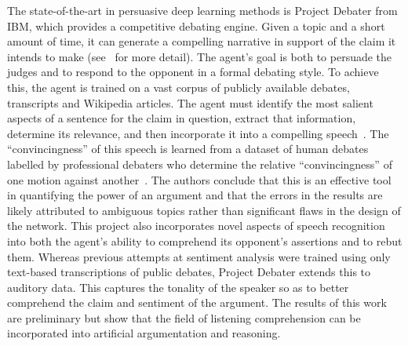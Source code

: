 The state-of-the-art in persuasive deep learning methods is Project Debater from IBM, which provides a competitive debating engine. Given a topic and a short amount of time, it can generate a compelling narrative in support of the claim it intends to make (see~\cite{Hou2017ArgumentModel, Mass2018WordSpeech} for more detail). The agent's goal is both to persuade the judges and to respond to the opponent in a formal debating style. To achieve this, the agent is trained on a vast corpus of publicly available debates, transcripts and Wikipedia articles. The agent must identify the most salient aspects of a sentence for the claim in question, extract that information, determine its relevance, and then incorporate it into a compelling speech~\cite{Levy2018TowardsSupervision}. The ``convincingness'' of this speech is learned from a dataset of human debates labelled by professional debaters who determine the relative ``convincingness'' of one motion against another~\cite{Habernal2016WhichLSTM}. The authors conclude that this is an effective tool in quantifying the power of an argument and that the errors in the results are likely attributed to ambiguous topics rather than significant flaws in the design of the network. This project also incorporates novel aspects of speech recognition into both the agent's ability to comprehend its opponent's assertions and to rebut them. Whereas previous attempts at sentiment analysis were trained using only text-based transcriptions of public debates, Project Debater extends this to auditory data. This captures the tonality of the speaker so as to better comprehend the claim and sentiment of the argument. The results of this work are preliminary but show that the field of listening comprehension can be incorporated into artificial argumentation and reasoning.


